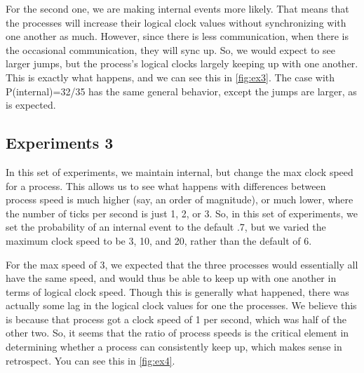 \documentclass[]{article}
\begin{document}
\begin{figure*}[!ht]
  \label{fig:ex2}
  \centering
    \texttt{[image: \{\{pictures/1457671089.64\_lc]}}}
    \texttt{[image: \{\{pictures/1457671089.64\_queue]}}}
    \caption{Experiments 2}
\end{figure*}


For the second one, we are making internal events more likely. That means that the processes will increase their logical clock values without synchronizing with one another as much. However, since there is less communication, when there is the occasional communication, they will sync up. So, we would expect to see larger jumps, but the process's logical clocks largely keeping up with one another. This is exactly what happens, and we can see this in \ref{fig:ex3}. The case with P(internal)=32/35 has the same general behavior, except the jumps are larger, as is expected.


\begin{figure*}[!ht]
  \label{fig:ex3}
  \centering
    \texttt{[image: \{\{pictures/1457671149.97\_lc]}}}
    \texttt{[image: \{\{pictures/1457671149.97\_queue]}}}
    \caption{Experiments 3}
\end{figure*}

\subsection{Experiments 3}
In this set of experiments, we maintain internal, but change the max clock speed for a process. This allows us to see what happens with differences between process speed is much higher (say, an order of magnitude), or much lower, where the number of ticks per second is just 1, 2, or 3. So, in this set of experiments, we set the probability of an internal event to the default .7, but we varied the maximum clock speed to be 3, 10, and 20, rather than the default of 6.

For the max speed of 3, we expected that the three processes would essentially all have the same speed, and would thus be able to keep up with one another in terms of logical clock speed. Though this is generally what happened, there was actually some lag in the logical clock values for one the processes. We believe this is because that process got a clock speed of 1 per second, which was half of the other two. So, it seems that the ratio of process speeds is the critical element in determining whether a process can consistently keep up, which makes sense in retrospect. You can see this in \ref{fig:ex4}.
\end{document}
